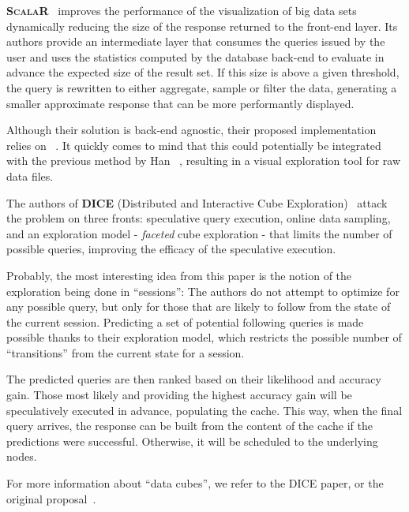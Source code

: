 \medskip

\textbf{\textsc{ScalaR}}~\cite{Battle2013} improves the performance of the visualization 
of big data sets dynamically reducing the size of the response returned to the 
front-end layer. Its authors provide an intermediate layer that consumes the 
queries issued by the user and uses the statistics computed by the database 
back-end to evaluate in advance the expected size of the result set. If this 
size is above a given threshold, the query is rewritten to either aggregate, 
sample or filter the data, generating a smaller approximate response that can be 
more performantly displayed.

Although their solution is back-end agnostic, their proposed implementation 
relies on \scidb~\cite{Stonebraker2011}. It quickly comes to mind that this could 
potentially be integrated with the previous method by Han \etal~\cite{Han2017}, 
resulting in a visual exploration tool for raw data files.

\medskip

The authors of \textbf{\textsc{DICE}} (Distributed and Interactive Cube 
Exploration)~\cite{Kamat2014} attack the problem on three fronts: speculative 
query execution, online data sampling, and an exploration model - 
\textit{faceted} cube exploration - that limits the number of possible queries, 
improving the efficacy of the speculative execution.

Probably, the most interesting idea from this paper is the notion of 
the exploration being done in ``sessions'': The authors do not attempt to 
optimize for any possible query, but only for those that are likely to follow 
from the state of the current session. Predicting a set of potential following 
queries is made possible thanks to their exploration model, which
restricts the possible number of ``transitions'' from the current state 
for a session.

The predicted queries are then ranked based on their likelihood and 
accuracy gain. Those most likely and providing the highest accuracy gain 
will be speculatively executed in advance, populating the cache. This way,
when the final  query arrives, the response can be built from the content of
the cache if the  predictions were successful. Otherwise, it will be scheduled
to the underlying nodes.

For more information about ``data cubes'', we refer to the DICE paper,
or the original proposal~\cite{Gray1997}.

\medskip

